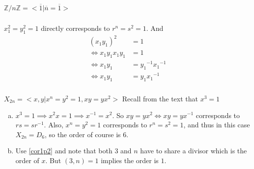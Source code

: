 \documentclass{article}
\newcommand{\ints}{\mathbb{Z}}
\newcommand{\inv}[1]{ {#1}^{-1} }
\renewcommand{\bar}{\overline}
\begin{document}
\subsubsection{}
$\ints/n\ints = < \bar{1} | \bar{n} = \bar{1} >$
\subsubsection{}
$x_1^2 = y_1^2 = 1$ directly corresponds to $r^n = s^2 = 1$. And
\begin{align*}
(x_1y_1)^2 &= 1\\
\iff x_1y_1x_1y_1 &= 1\\
\iff x_1y_1 &= \inv{y_1}\inv{x_1}\\
\iff x_1y_1 &= y_1\inv{x_1}
\end{align*}
\subsubsection{}
$X_{2n} = <x,y | x^n = y^2 = 1, xy=yx^2>$
Recall from the text that $x^3 = 1$
\begin{enumerate}[(a)]
\item $x^3 = 1 \implies x^2 x = 1 \implies \inv{x} = x^2$. So $xy=yx^2 \iff xy = y\inv{x}$ corresponds to $rs = s\inv{r}$. Also, $x^n =y^2=1$ corresponds to $ r^n =s^2=1$, and thus in this case $X_{2n} = D_6$, so the order of course is $6$.
\item Use \ref{cor1p2} and note that both $3$ and $n$ have to share a divisor which is the order of $x$. But $(3,n) = 1$ implies the order is $1$.
\end{enumerate}
\end{document}
